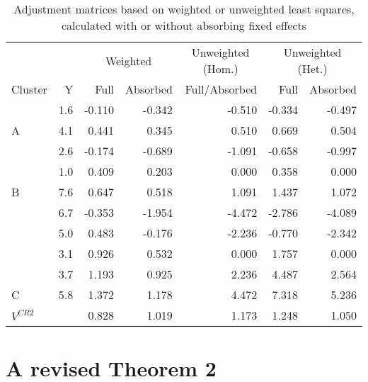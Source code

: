 \documentclass[12pt]{article}
\begin{document}
\begin{table}

\caption{\label{tab:example}Adjustment matrices based on weighted or unweighted least squares, calculated with or without absorbing fixed effects}
\centering
\begin{tabular}[t]{lrrrrrr}
\toprule
\multicolumn{2}{c}{ } & \multicolumn{2}{c}{Weighted} & \multicolumn{1}{c}{Unweighted (Hom.)} & \multicolumn{2}{c}{Unweighted (Het.)} \\
\cmidrule(l{3pt}r{3pt}){3-4} \cmidrule(l{3pt}r{3pt}){5-5} \cmidrule(l{3pt}r{3pt}){6-7}
Cluster & Y & Full & Absorbed & Full/Absorbed & Full & Absorbed\\
\midrule
 & 1.6 & -0.110 & -0.342 & -0.510 & -0.334 & -0.497\\

\multirow[t]{-2}{*}{\raggedright\arraybackslash A} & 4.1 & 0.441 & 0.345 & 0.510 & 0.669 & 0.504\\

 & 2.6 & -0.174 & -0.689 & -1.091 & -0.658 & -0.997\\

 & 1.0 & 0.409 & 0.203 & 0.000 & 0.358 & 0.000\\

\multirow[t]{-3}{*}{\raggedright\arraybackslash B} & 7.6 & 0.647 & 0.518 & 1.091 & 1.437 & 1.072\\

 & 6.7 & -0.353 & -1.954 & -4.472 & -2.786 & -4.089\\

 & 5.0 & 0.483 & -0.176 & -2.236 & -0.770 & -2.342\\

 & 3.1 & 0.926 & 0.532 & 0.000 & 1.757 & 0.000\\

 & 3.7 & 1.193 & 0.925 & 2.236 & 4.487 & 2.564\\

\multirow[t]{-5}{*}{\raggedright\arraybackslash C} & 5.8 & 1.372 & 1.178 & 4.472 & 7.318 & 5.236\\
\midrule

$V^{CR2}$ &  & 0.828 & 1.019 & 1.173 & 1.248 & 1.050\\
\bottomrule
\end{tabular}
\end{table}

\hypertarget{revised}{%
\section{A revised Theorem 2}\label{revised}}
\end{document}
